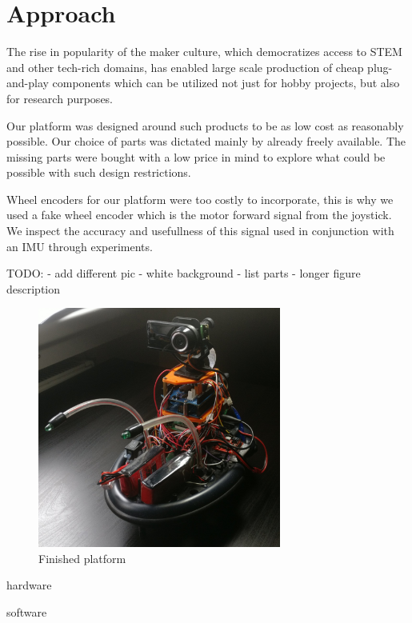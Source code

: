 \documentclass[class=article, crop=false]{standalone}
\begin{document}
\chapter{Approach}\label{cha:approach}

The rise in popularity of the maker culture, which democratizes access to STEM and other tech-rich domains, has enabled large scale production of cheap plug-and-play components which can be utilized not just for hobby projects, but also for research purposes.

Our platform was designed around such products to be as low cost as reasonably possible. Our choice of parts was dictated mainly by already freely available. The missing parts were bought with a low price in mind to explore what could be possible with such design restrictions.

Wheel encoders for our platform were too costly to incorporate, this is why we used a fake wheel encoder which is the motor forward signal from the joystick. We inspect the accuracy and usefullness of this signal used in conjunction with an IMU through experiments.

TODO:
- add different pic
- white background
- list parts
- longer figure description

\begin{figure}
  \centering
  \includegraphics[width=8cm]{images/garry.jpg}
  \caption{Finished platform}
\end{figure}

{hardware}

{software}
\end{document}
